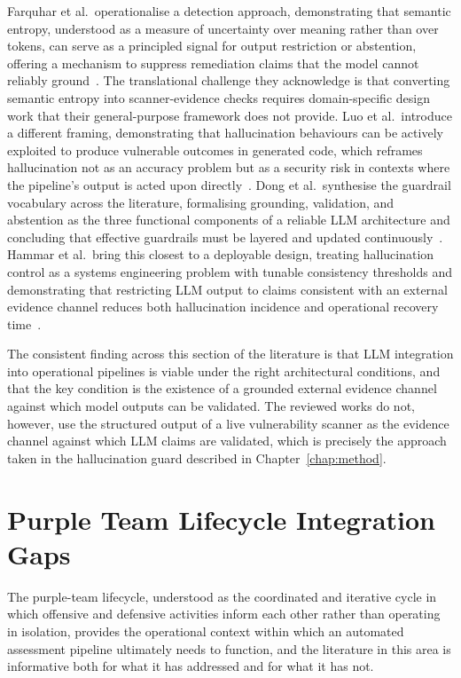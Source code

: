 \documentclass[12pt, a4paper, oneside]{report}
\begin{document}
Farquhar et al.\ operationalise a detection approach, demonstrating that
semantic entropy, understood as a measure of uncertainty over meaning
rather than over tokens, can serve as a principled signal for output
restriction or abstention, offering a mechanism to suppress remediation
claims that the model cannot reliably ground~\cite{farquhar2024}. The
translational challenge they acknowledge is that converting semantic
entropy into scanner-evidence checks requires domain-specific design
work that their general-purpose framework does not provide. Luo et al.\
introduce a different framing, demonstrating that hallucination
behaviours can be actively exploited to produce vulnerable outcomes in
generated code, which reframes hallucination not as an accuracy problem
but as a security risk in contexts where the pipeline's output is acted
upon directly~\cite{luo2025}. Dong et al.\ synthesise the guardrail
vocabulary across the literature, formalising grounding, validation, and
abstention as the three functional components of a reliable LLM
architecture and concluding that effective guardrails must be layered
and updated continuously~\cite{dong2025}. Hammar et al.\ bring this
closest to a deployable design, treating hallucination control as a
systems engineering problem with tunable consistency thresholds and
demonstrating that restricting LLM output to claims consistent with an
external evidence channel reduces both hallucination incidence and
operational recovery time~\cite{hammar2026}.

The consistent finding across this section of the literature is that LLM
integration into operational pipelines is viable under the right
architectural conditions, and that the key condition is the existence of
a grounded external evidence channel against which model outputs can be
validated. The reviewed works do not, however, use the structured output
of a live vulnerability scanner as the evidence channel against which
LLM claims are validated, which is precisely the approach taken in the
hallucination guard described in Chapter~\ref{chap:method}.

\section{Purple Team Lifecycle Integration Gaps}

The purple-team lifecycle, understood as the coordinated and iterative
cycle in which offensive and defensive activities inform each other
rather than operating in isolation, provides the operational context
within which an automated assessment pipeline ultimately needs to
function, and the literature in this area is informative both for what
it has addressed and for what it has not.
\end{document}

